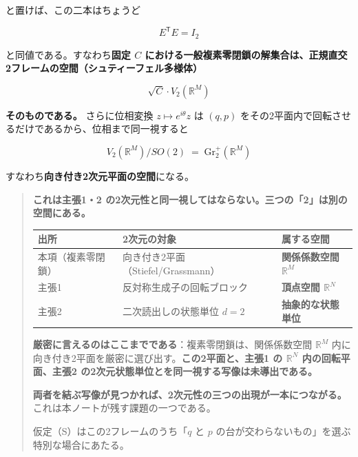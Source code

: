 \documentclass[
  10pt,
]{ltjsarticle}
\newcounter{none} %
\begin{document}
と置けば、この二本はちょうど

\[\boxed{\;E^{\mathsf T}E = I_2\;}\]

と同値である。すなわち\textbf{固定 \(C\)
における一般複素零閉鎖の解集合は、正規直交2フレームの空間（シュティーフェル多様体）}

\[\sqrt{C}\cdot V_2(\mathbb{R}^M)\]

\textbf{そのものである。} さらに位相変換 \(z \mapsto e^{i\theta}z\) は
\((q,p)\) をその2平面内で回転させるだけであるから、位相まで同一視すると

\[V_2(\mathbb{R}^M)/SO(2) \;=\; \mathrm{Gr}_2^{+}(\mathbb{R}^M)\]

すなわち\textbf{向き付き2次元平面の空間}になる。

\begin{quote}
\textbf{これは主張1・2
の2次元性と同一視してはならない。三つの「2」は別の空間にある。}

{\def\LTcaptype{none} %
\begin{longtable}[]{@{}
  >{\raggedright\arraybackslash}p{}
  >{\raggedright\arraybackslash}p{}
  >{\raggedright\arraybackslash}p{}@{}}
\toprule\noalign{}
\begin{minipage}[b]{\linewidth}\raggedright
出所
\end{minipage} & \begin{minipage}[b]{\linewidth}\raggedright
2次元の対象
\end{minipage} & \begin{minipage}[b]{\linewidth}\raggedright
属する空間
\end{minipage} \\
\midrule\noalign{}
\endhead
\bottomrule\noalign{}
\endlastfoot
本項（複素零閉鎖） & 向き付き2平面（Stiefel/Grassmann） &
\textbf{関係係数空間 \(\mathbb{R}^M\)} \\
主張1 & 反対称生成子の回転ブロック & \textbf{頂点空間
\(\mathbb{R}^N\)} \\
主張2 & 二次読出しの状態単位 \(d=2\) & \textbf{抽象的な状態単位} \\
\end{longtable}
}

\textbf{厳密に言えるのはここまでである}：複素零閉鎖は、関係係数空間
\(\mathbb{R}^M\)
内に向き付き2平面を厳密に選び出す。\textbf{この2平面と、主張1 の
\(\mathbb{R}^N\) 内の回転平面、主張2
の2次元状態単位とを同一視する写像は未導出である。}

\textbf{両者を結ぶ写像が見つかれば、2次元性の三つの出現が一本につながる。}
これは本ノートが残す課題の一つである。

仮定（S）はこの2フレームのうち「\(q\) と \(p\)
の台が交わらないもの」を選ぶ特別な場合にあたる。
\end{quote}
\end{document}
